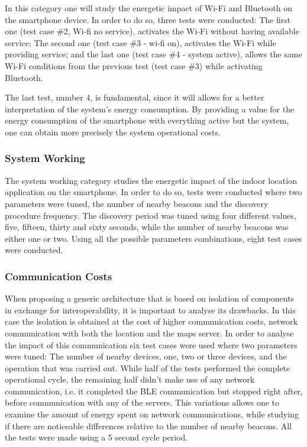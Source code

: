   
In this category one will study the energetic impact of Wi-Fi and Bluetooth on the smartphone device. In order to do so, three tests were conducted: The first one (test case \#2, Wi-fi no service), activates the Wi-Fi without having available service; The second one (test case \#3 - wi-fi on), activates the Wi-Fi while providing service; and the last one (test case \#4 - system active), allows the same Wi-Fi conditions from the previous test (test case \#3) while activating Bluetooth.  
  
  
The last test, number 4, is fundamental, since it will allows for a better interpretation of the system's energy consumption. By providing a value for the energy consumption of the smartphone with everything active but the system, one can obtain more precisely the system operational costs.  
  
  
\subsubsection{System Working}  
\label{subsec:syswork}  
  
  
The system working category studies the energetic impact of the indoor location application on the smartphone. In order to do so, tests were conducted where two parameters were tuned, the number of nearby beacons and the discovery procedure frequency. The discovery period was tuned using four different values, five, fifteen, thirty and sixty seconds, while the number of nearby beacons was either one or two. Using all the possible parameters combinations, eight test cases were conducted.  
  
  
\subsubsection{Communication Costs}  
\label{subsec:commcosts}  
  
  
When proposing a generic architecture that is based on isolation of components in exchange for interoperability, it is important to analyse its drawbacks. In this case the isolation is obtained at the cost of higher communication costs, network communication with both the location and the maps server. In order to analyse the impact of this communication six test cases were used where two parameters were tuned: The number of nearby devices, one, two or three devices, and the operation that was carried out. While half of the tests performed the complete operational cycle, the remaining half didn't make use of any network communication, i.e. it completed the \ac{BLE} communication but stopped right after, before communication with any of the servers. This variations allows one to examine the amount of energy spent on network communications, while studying if there are noticeable differences relative to the number of nearby beacons. All the tests were made using a 5 second cycle period.  
  
